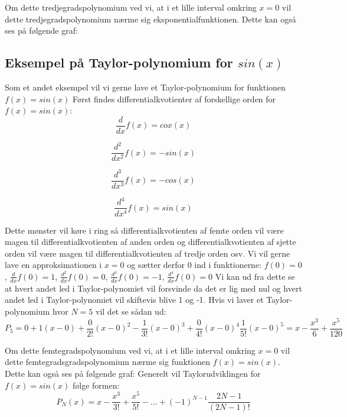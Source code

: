 Om dette tredjegradspolynomium ved vi, at i et lille interval omkring $x=0$ vil dette tredjegradspolynomium nærme sig eksponentialfunktionen. Dette kan også ses på følgende graf:

\subsection*{Eksempel på Taylor-polynomium for $sin(x)$}
Som et andet eksempel vil vi gerne lave et Taylor-polynomium for funktionen $f(x)=sin(x)$ Først findes differentialkvotienter af forskellige orden for $f(x)=sin(x)$:
\[
\frac{d}{dx}f(x)=cox(x)       
\]

\[
\frac{d^2}{dx^2}f(x)=-sin(x)
\]

\[
\frac{d^3}{dx^3}f(x)=-cos(x)
\]

\[
\frac{d^4}{dx^4}f(x)=sin(x)
\]

Dette mønster vil køre i ring så differentialkvotienten af femte orden vil være magen til differentialkvotienten af anden orden og differentialkvotienten af sjette orden vil være magen til differentialkvotienten af tredje orden osv. Vi vil gerne lave en approksimationen i $x=0$ og sætter derfor 0 ind i funktionerne:
$f(0)=0$, $\frac{d}{dx}f(0)=1$,  $\frac{d^2}{dx}f(0)=0$,                     $\frac{d^3}{dx}f(0)=-1$,    $\frac{d^4}{dx}f(0)=0$
Vi kan ud fra dette se at hvert andet led i Taylor-polynomiet vil forsvinde da det er lig med nul og hvert andet led i Taylor-polynomiet vil skiftevis blive 1 og -1. Hvis vi laver et Taylor-polynomium hvor $N=5$ vil det se sådan ud:
\[
P_5=0+1(x-0)+\frac{0}{2!}(x-0)^2-\frac{1}{3!}(x-0)^3+\frac{0}{4!}(x-0)^4\frac{1}{5!}(x-0)^5=x-\frac{x^3}{6}+\frac{x^5}{120}
\]

Om dette femtegradspolynomium ved vi, at i et lille interval omkring $x=0$ vil dette femtegradsgradspolynomium nærme sig funktionen $f(x)=sin(x)$. Dette kan også ses på følgende graf:
Generelt vil Taylorudviklingen for $f(x)=sin(x)$ følge formen:
\[
P_{N}(x)=x-\frac{x^3}{3!}+\frac{x^5}{5!}-...+(-1)^{N-1}\frac{2N-1}{(2N-1)!}
\]


